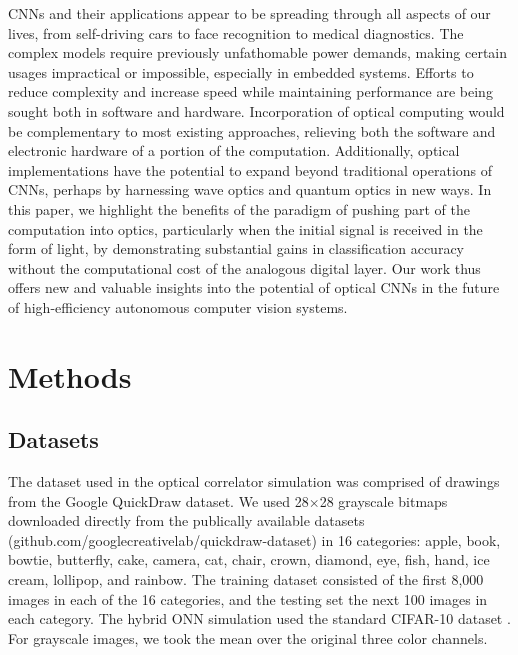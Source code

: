 \documentclass[fleqn,10pt]{wlscirep}
\begin{document}
CNNs and their applications appear to be spreading through all aspects of our lives, from self-driving cars to face recognition to medical diagnostics. The complex models require previously unfathomable power demands, making certain usages impractical or impossible, especially in embedded systems. Efforts to reduce complexity and increase speed while maintaining performance are being sought both in software and hardware. Incorporation of optical computing would be complementary to most existing approaches, relieving both the software and electronic hardware of a portion of the computation. Additionally, optical implementations have the potential to expand beyond traditional operations of CNNs, perhaps by harnessing wave optics and quantum optics in new ways. In this paper, we highlight the benefits of the paradigm of pushing part of the computation into optics, particularly when the initial signal is received in the form of light, by demonstrating substantial gains in classification accuracy without the computational cost of the analogous digital layer. Our work thus offers new and valuable insights into the potential of optical CNNs in the future of high-efficiency autonomous computer vision systems.


\section*{Methods}
\subsection*{Datasets} 
The dataset used in the optical correlator simulation was comprised of drawings from the Google QuickDraw dataset. We used 28$\times$28 grayscale bitmaps downloaded directly from the publically available datasets (github.com/googlecreativelab/quickdraw-dataset) in 16 categories: apple, book, bowtie, butterfly, cake, camera, cat, chair, crown, diamond, eye, fish, hand, ice cream, lollipop, and rainbow. The training dataset consisted of the first 8,000 images in each of the 16 categories, and the testing set the next 100 images in each category. The hybrid ONN simulation used the standard CIFAR-10 dataset \cite{krizhevsky2009learning}. For grayscale images, we took the mean over the original three color channels.
\end{document}
